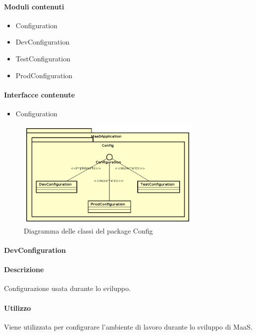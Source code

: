 \paragraph*{Moduli contenuti}
\begin{itemize}
\item Configuration
\item DevConfiguration
\item TestConfiguration
\item ProdConfiguration
\end{itemize}

\paragraph*{Interfacce contenute}
\begin{itemize}
\item Configuration
\end{itemize}

\begin{figure}[H]
\centering
\includegraphics[width=0.8\textwidth]{res/sections/backend/config.png}
\caption{Diagramma delle classi del package Config}
\end{figure}

\paragraph{DevConfiguration}
\paragraph*{Descrizione}
Configurazione usata durante lo sviluppo.

\paragraph*{Utilizzo}
Viene utilizzata per configurare l'ambiente di lavoro durante lo sviluppo di MaaS.

